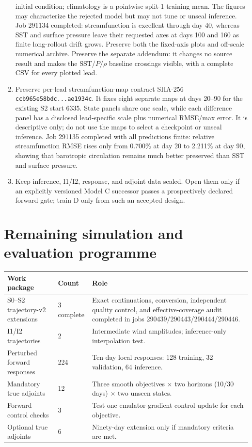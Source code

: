 \documentclass[11pt]{article}
\begin{document}
\begin{enumerate}
  initial condition; climatology is a pointwise split-1 training mean.  The figures
  may characterize the rejected model but may not tune or unseal inference.  Job
  291134 completed: streamfunction is excellent through day 40, whereas SST and
  surface pressure leave their requested axes at days 100 and 160 as finite
  long-rollout drift grows.  Preserve both the fixed-axis plots and off-scale
  numerical archive.  Preserve the separate
   addendum: it changes no source
  result and makes the SST/\(P/\rho\) baseline crossings visible, with a complete
  CSV for every plotted lead.
\item Preserve per-lead streamfunction-map contract SHA-256
  \texttt{ccb965e58bdc\allowbreak...\allowbreak ae1934c}.  It fixes eight
  separate maps at days 20--90 for the existing S2 start 6335.  State panels share
  one scale, while each difference panel has a disclosed lead-specific scale plus
  numerical RMSE/max error.  It is descriptive only; do not use the maps to select a
  checkpoint or unseal inference.  Job 291135 completed with all predictions finite:
  relative streamfunction RMSE rises only from 0.700\% at day 20 to 2.211\% at
  day 90, showing that barotropic circulation remains much better preserved than SST
  and surface pressure.
\item Keep inference, I1/I2, response, and adjoint data sealed.  Open them only if an
  explicitly versioned Model C successor passes a prospectively declared forward gate;
  train D only from such an accepted design.
\end{enumerate}

\section{Remaining simulation and evaluation programme}

\begin{tabularx}{\textwidth}{@{}p{}p{}Y@{}}
\toprule
\textbf{Work package} & \textbf{Count} & \textbf{Role} \\
\midrule
S0--S2 trajectory-v2 extensions & 3 complete & Exact continuations, conversion, independent quality control, and effective-coverage audit completed in jobs 290439/290443/290444/290446. \\
I1/I2 trajectories & 2 & Intermediate wind amplitudes; inference-only interpolation test. \\
Perturbed forward responses & 224 & Ten-day local responses: 128 training, 32 validation, 64 inference. \\
Mandatory true adjoints & 12 & Three smooth objectives $\times$ two horizons (10/30 days) $\times$ two unseen states. \\
Forward control checks & 3 & Test one emulator-gradient control update for each objective. \\
Optional true adjoints & 6 & Ninety-day extension only if mandatory criteria are met. \\
\bottomrule
\end{tabularx}
\end{document}
